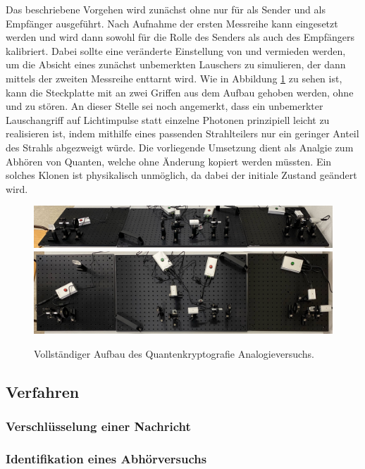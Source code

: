 Das beschriebene Vorgehen wird zunächst ohne \grqq{} nur für \grqq{} als Sender und \grqq{} als
Empfänger ausgeführt. Nach Aufnahme der ersten Messreihe kann \grqq{} eingesetzt werden und wird dann sowohl für die
Rolle des Senders als auch des Empfängers kalibriert. Dabei sollte eine veränderte Einstellung von \grqq{} und
\grqq{} vermieden werden, um die Absicht eines zunächst unbemerkten Lauschers zu simulieren, der dann mittels der
zweiten Messreihe enttarnt wird. Wie in Abbildung \ref{fig:aufbau} zu sehen ist, kann die Steckplatte mit \grqq{}
an zwei Griffen aus dem Aufbau gehoben werden, ohne \grqq{} und \grqq{} zu stören. An dieser Stelle
sei noch angemerkt, dass ein unbemerkter Lauschangriff auf Lichtimpulse statt einzelne Photonen prinzipiell leicht zu
realisieren ist, indem mithilfe eines passenden Strahlteilers nur ein geringer Anteil des Strahls abgezweigt würde. Die
vorliegende Umsetzung dient als Analgie zum Abhören von Quanten, welche ohne Änderung kopiert werden müssten. Ein solches
Klonen ist physikalisch unmöglich, da dabei der initiale Zustand geändert wird.

\begin{figure}[H]
	\centering
	\includegraphics[width=1.0\textwidth]{content/aufbau/front.jpg}\\[1ex]
	\includegraphics[width=1.0\textwidth]{content/aufbau/drauf.jpg}
	\caption{Vollständiger Aufbau des Quantenkryptografie Analogieversuchs.}
	\label{fig:aufbau}
\end{figure}



\subsection{Verfahren}



\subsubsection{Verschlüsselung einer Nachricht}



\subsubsection{Identifikation eines Abhörversuchs}
